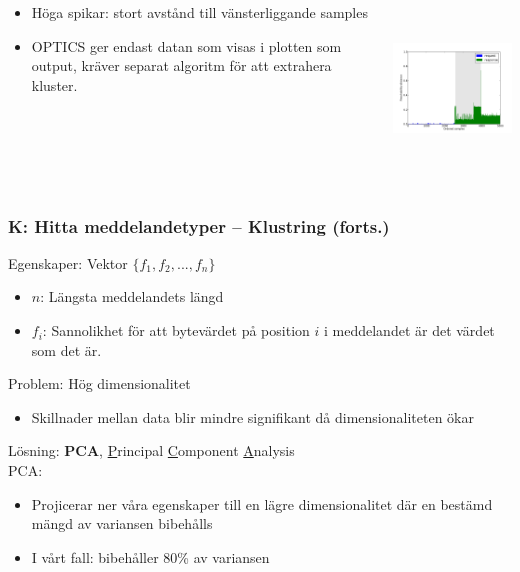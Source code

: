 \documentclass[xetex, 8pt]{beamer}
\begin{document}
\begin{frame}
\begin{columns}[t]
\begin{column}[T]{6cm}
\begin{itemize}
                    \item Höga spikar: stort avstånd till vänsterliggande samples
                    \item OPTICS ger endast datan som visas i plotten som output,
                        kräver separat algoritm för att extrahera kluster.
                \end{itemize}
            \end{column}
            \begin{column}[T]{6cm}
                \includegraphics[height=4.5cm]{img/hierextr.pdf}
            \end{column}
        \end{columns}
    \end{frame}
    \begin{frame}
        \frametitle{K: Hitta meddelandetyper -- Klustring (forts.)}
        Egenskaper: Vektor $\{f_1, f_2, ..., f_n\}$
        \begin{itemize}
            \item $n$: Längsta meddelandets längd
            \item $f_i$: Sannolikhet för att bytevärdet på position $i$ i
                meddelandet är det värdet som det är.
        \end{itemize}
        \vskip20pt
        Problem: Hög dimensionalitet \\
        \begin{itemize}
            \item Skillnader mellan data blir mindre signifikant då
                dimensionaliteten ökar
        \end{itemize}
        Lösning: \textbf{PCA}, \scriptsize{\underline{P}rincipal
            \underline{C}omponent \underline{A}nalysis} \\
        PCA:
        \begin{itemize}
            \item Projicerar ner våra egenskaper till en lägre dimensionalitet
                där en bestämd mängd av variansen bibehålls
            \item I vårt fall: bibehåller 80\% av variansen
        \end{itemize}
    \end{frame}
\end{document}
